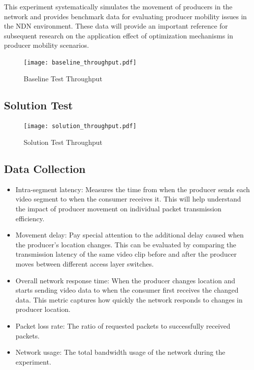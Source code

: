 \documentclass[conference]{IEEEtran}
\begin{document}
This experiment systematically simulates the movement of producers in the network and provides benchmark data for evaluating producer mobility issues in the NDN environment. These data will provide an important reference for subsequent research on the application effect of optimization mechanisms in producer mobility scenarios.

\begin{figure}
    \centering
    \texttt{[image: baseline\_throughput.pdf]} %
    \caption{Baseline Test Throughput}
    \label{fig:baseline-throughput}
\end{figure}

\subsection{Solution Test}
\begin{figure}
    \centering
    \texttt{[image: solution\_throughput.pdf]} %
    \caption{Solution Test Throughput}
    \label{fig:solution-throughput}
\end{figure}

\subsection{Data Collection}
\begin{itemize}
    \item Intra-segment latency: Measures the time from when the producer sends each video segment to when the consumer receives it. This will help understand the impact of producer movement on individual packet transmission efficiency.
    \item Movement delay: Pay special attention to the additional delay caused when the producer's location changes. This can be evaluated by comparing the transmission latency of the same video clip before and after the producer moves between different access layer switches.
    \item Overall network response time: When the producer changes location and starts sending video data to when the consumer first receives the changed data. This metric captures how quickly the network responds to changes in producer location.
    \item Packet loss rate: The ratio of requested packets to successfully received packets.
    \item Network usage: The total bandwidth usage of the network during the experiment.
\end{itemize}
\end{document}
